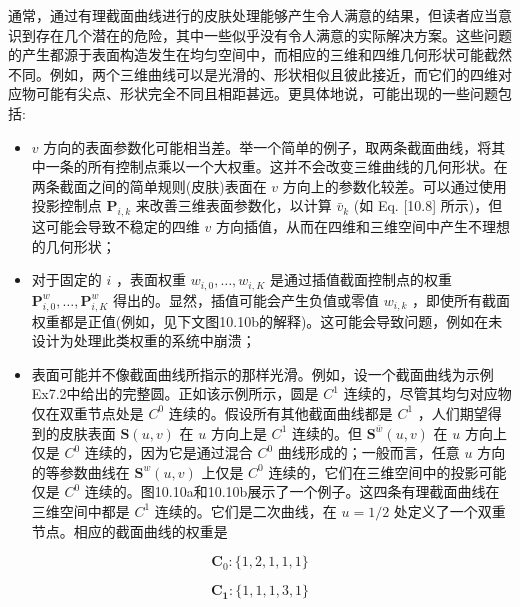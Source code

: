 \documentclass[../main.tex]{subfiles}
\begin{document}
通常，通过有理截面曲线进行的皮肤处理能够产生令人满意的结果，但读者应当意识到存在几个潜在的危险，其中一些似乎没有令人满意的实际解决方案。这些问题的产生都源于表面构造发生在均匀空间中，而相应的三维和四维几何形状可能截然不同。例如，两个三维曲线可以是光滑的、形状相似且彼此接近，而它们的四维对应物可能有尖点、形状完全不同且相距甚远。更具体地说，可能出现的一些问题包括:

\begin{itemize}
\item \(v\) 方向的表面参数化可能相当差。举一个简单的例子，取两条截面曲线，将其中一条的所有控制点乘以一个大权重。这并不会改变三维曲线的几何形状。在两条截面之间的简单规则(皮肤)表面在 \(v\) 方向上的参数化较差。可以通过使用投影控制点 \({\mathbf{P}}_{i,k}\) 来改善三维表面参数化，以计算 \({\bar{v}}_{k}\) (如 Eq. [10.8] 所示)，但这可能会导致不稳定的四维 \(v\) 方向插值，从而在四维和三维空间中产生不理想的几何形状；
\end{itemize}

\begin{itemize}
\item 对于固定的 \(i\) ，表面权重 \({w}_{i,0},\ldots ,{w}_{i,K}\) 是通过插值截面控制点的权重 \({\mathbf{P}}_{i,0}^{w},\ldots ,{\mathbf{P}}_{i,K}^{w}\) 得出的。显然，插值可能会产生负值或零值 \({w}_{i,k}\) ，即使所有截面权重都是正值(例如，见下文图10.10b的解释)。这可能会导致问题，例如在未设计为处理此类权重的系统中崩溃；
\end{itemize}

\begin{itemize}
\item 表面可能并不像截面曲线所指示的那样光滑。例如，设一个截面曲线为示例Ex7.2中给出的完整圆。正如该示例所示，圆是 \({C}^{1}\) 连续的，尽管其均匀对应物仅在双重节点处是 \({C}^{0}\) 连续的。假设所有其他截面曲线都是 \({C}^{1}\) ，人们期望得到的皮肤表面 \(\mathbf{S}\left( {u,v}\right)\) 在 \(u\) 方向上是 \({C}^{1}\) 连续的。但 \({\mathbf{S}}^{\bar{w}}\left( {u,v}\right)\) 在 \(u\) 方向上仅是 \({C}^{0}\) 连续的，因为它是通过混合 \({C}^{0}\) 曲线形成的；一般而言，任意 \(u\) 方向的等参数曲线在 \({\mathbf{S}}^{w}\left( {u,v}\right)\) 上仅是 \({C}^{0}\) 连续的，它们在三维空间中的投影可能仅是 \({C}^{0}\) 连续的。图10.10a和10.10b展示了一个例子。这四条有理截面曲线在三维空间中都是 \({C}^{1}\) 连续的。它们是二次曲线，在 \(u = 1/2\) 处定义了一个双重节点。相应的截面曲线的权重是
\end{itemize}

\[
{\mathbf{C}}_{0} : \{ 1,2,1,1,1\}
\]

\[
{\mathbf{C}}_{\mathbf{1}} : \{ 1,1,1,3,1\}
\]
\end{document}
